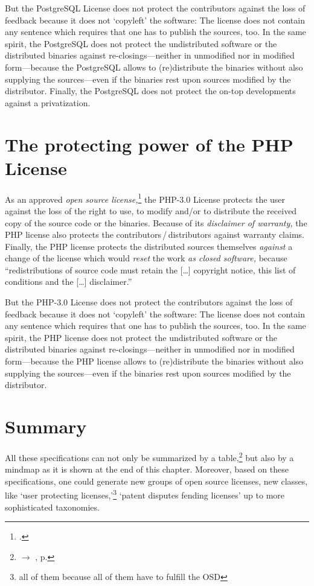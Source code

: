But the PostgreSQL License does not protect the contributors against the loss of
feedback because it does not `copyleft' the software: The license does not
contain any sentence which requires that one has to publish the sources, too. 
In the same spirit, the PostgreSQL does not protect the undistributed software or the
distributed binaries against re-closings---neither in unmodified nor in
modified form---because the PostgreSQL allows to (re)distribute the binaries without
also supplying the sources---even if the binaries rest upon sources modified by
the distributor. Finally, the PostgreSQL does not protect the on-top developments
against a privatization.


\section{\texorpdfstring{The protecting power of the}{The} PHP License}

As an approved \emph{open source license,}\footcite[cf.][\nopage wp]{OSI2012b}
the PHP-3.0 License protects the user against the loss of the right to use, to
modify and/or to distribute the received copy of the source code or the
binaries.\citePHP{} Because of its \emph{disclaimer of warranty,} the PHP
license also protects the contributors\,/\,distributors against warranty
claims.\citePHP{}  Finally, the PHP license protects the distributed
sources themselves \emph{against} a change of the license which would
\emph{reset} the work \emph{as closed software,} because
\enquote{redistributions of source code must retain the [\ldots] copyright
notice, this list of conditions and the [\ldots] disclaimer.}\citePHP{}

But the PHP-3.0 License does not protect the contributors against the loss of
feedback because it does not `copyleft' the software: The license does not
contain any sentence which requires that one has to publish the sources, too. 
In the same spirit, the PHP license does not protect the undistributed software
or the distributed binaries against re-closings---neither in unmodified nor in
modified form---because the PHP license allows to (re)distribute the binaries
without also supplying the sources---even if the binaries rest upon sources
modified by the distributor.
  
\section{Summary}

All these specifications can not only be summarized by a
table,\footnote{$\rightarrow$ \oslic{}, p. \pageref{tab:powerOfLicenses}} but also
by a mindmap as it is shown at the end of this chapter. Moreover, based on these
specifications, one could generate new groups of open source licenses, new
classes, like `user protecting licenses,'\footnote{all of them because all of
them have to fulfill the OSD} `patent disputes fending licenses' up to more
sophisticated taxonomies.

